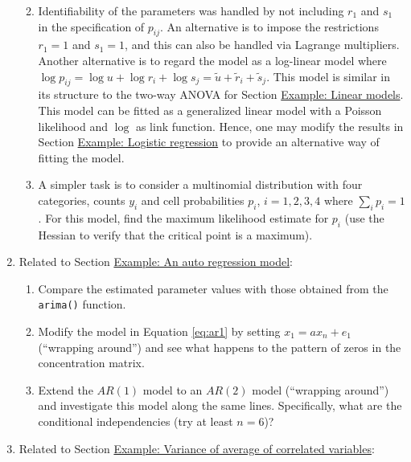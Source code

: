 \begin{enumerate}
  \begin{enumerate}
  \def\labelenumii{\alph{enumii})}
  \tightlist
  \item
    Identifiability of the parameters was handled by not including
    \(r_1\) and \(s_1\) in the specification of \(p_{ij}\). An alternative is
    to impose the restrictions \(r_1=1\) and \(s_1=1\), and this can also
    be handled via Lagrange multipliers. Another alternative is to regard
    the model as a log-linear model where \(\log p_{ij} = \log u + \log r_i + \log s_j = \tilde{u} + \tilde{r}_i + \tilde{s}_j\). This model
    is similar in its structure to the two-way ANOVA for Section \protect\hyperlink{example-linear-models}{Example: Linear
    models}. This model can be fitted as a generalized linear model
    with a Poisson likelihood and \(\log\) as link function. Hence, one
    may modify the results in Section \protect\hyperlink{example-logistic-regression}{Example: Logistic regression} to
    provide an alternative way of fitting the model.
  \item
    A simpler task is
    to consider a multinomial distribution with four categories,
    counts \(y_i\) and cell probabilities \(p_i\), \(i=1,2,3,4\) where \(\sum_i p_i=1\). For this model, find the maximum likelihood estimate for
    \(p_i\) (use the Hessian to verify that the critical point is a maximum).
  \end{enumerate}
\item
  Related to Section \protect\hyperlink{example-an-auto-regression-model}{Example: An auto regression model}:

  \begin{enumerate}
  \def\labelenumii{\alph{enumii})}
  \tightlist
  \item
    Compare the estimated parameter values with those obtained from
    the \texttt{arima()} function.
  \item
    Modify the model in Equation \eqref{eq:ar1} by
    setting \(x_1 = a x_n + e_1\) (``wrapping around'') and see what happens
    to the pattern of zeros in the concentration matrix.
  \item
    Extend the
    \(AR(1)\) model to an \(AR(2)\) model (``wrapping around'') and
    investigate this model along the same lines. Specifically,
    what are the conditional independencies (try at least \(n=6\))?
  \end{enumerate}
\item
  Related to Section \protect\hyperlink{example-variance-of-average-of-correlated-variables}{Example: Variance of average of correlated variables}:


\end{enumerate}
